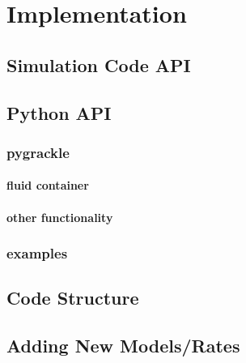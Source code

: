 \section{Implementation} \label{methods:code}



\subsection{Simulation Code API}


\subsection{Python API}

\subsubsection{pygrackle}

\paragraph{fluid container}

\paragraph{other functionality}


\subsubsection{examples}


\subsection{Code Structure}


\subsection{Adding New Models/Rates}
